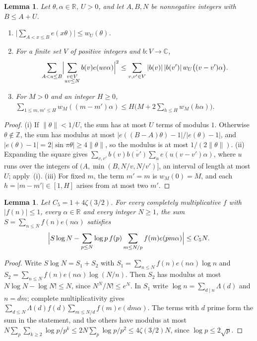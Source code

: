 \documentclass[12pt]{amsart}
\newtheorem{lemma}[theorem]{Lemma}
\theoremstyle{remark}
\newcommand{\C}{\mathbb{C}}
\newcommand{\R}{\mathbb{R}}
\begin{document}
\begin{lemma}\label{lem:bilinear}
Let $\theta,\alpha\in\R$, $U>0$, and let $A,B,N$ be nonnegative integers with $B\le A+U$.
\begin{enumerate}
\item[(i)] $\bigl|\sum_{A<x\le B}e(x\theta)\bigr|\le w_U(\theta)$.
\item[(ii)] For a finite set $V$ of positive integers and $b:V\to\C$,
\[
  \sum_{A<u\le B}\Bigl|\sum_{\substack{v\in V\\uv\le N}}b(v)e(uv\alpha)\Bigr|^2\le
  \sum_{v,v'\in V}|b(v)|\,|b(v')|\,w_U\bigl((v-v')\alpha\bigr).
\]
\item[(iii)] For $M>0$ and an integer $H\ge0$,
$\sum_{1\le m,m'\le H}w_M((m-m')\alpha)\le H\bigl(M+2\sum_{h\le H}w_M(h\alpha)\bigr)$.
\end{enumerate}
\end{lemma}

\begin{proof}
(i) If $\|\theta\|<1/U$, the sum has at most $U$ terms of modulus $1$. Otherwise
$\theta\notin\mathbb Z$, the sum has modulus at most $|e((B-A)\theta)-1|/|e(\theta)-1|$, and
$|e(\theta)-1|=2|\sin\pi\theta|\ge4\|\theta\|$, so the modulus is at most $1/(2\|\theta\|)$. (ii) Expanding the square gives
$\sum_{v,v'}b(v)\overline{b(v')}\sum_ue(u(v-v')\alpha)$, where $u$ runs over the integers of
$(A,\min(B,N/v,N/v')]$, an interval of length at most $U$; apply~(i). (iii) For fixed $m$, the
term $m'=m$ is $w_M(0)=M$, and each $h=|m-m'|\in[1,H]$ arises from at most two $m'$.
\end{proof}

\begin{lemma}\label{lem:reduction}
Let $C_5=1+4\zeta(3/2)$. For every completely multiplicative $f$ with $|f(n)|\le1$, every
$\alpha\in\R$ and every integer $N\ge1$, the sum $S=\sum_{n\le N}f(n)e(n\alpha)$ satisfies
\[
  \Bigl|S\log N-\sum_{p\le N}\log p\,f(p)\sum_{m\le N/p}f(m)e(pm\alpha)\Bigr|\le C_5N.
\]
\end{lemma}

\begin{proof}
Write $S\log N=S_1+S_2$ with $S_1=\sum_{n\le N}f(n)e(n\alpha)\log n$ and
$S_2=\sum_{n\le N}f(n)e(n\alpha)\log(N/n)$. Then $S_2$ has modulus at most $N\log N-\log N!\le N$, since $N^N/N!\le e^N$. In $S_1$ write
$\log n=\sum_{d\mid n}\Lambda(d)$ and $n=dm$; complete multiplicativity gives
$\sum_{d\le N}\Lambda(d)f(d)\sum_{m\le N/d}f(m)e(dm\alpha)$. The terms with $d$ prime form the sum in
the statement, and the others have modulus at most
$N\sum_p\sum_{k\ge2}\log p/p^k\le2N\sum_p\log p/p^2\le4\zeta(3/2)N$, since $\log p\le2\sqrt p$.
\end{proof}
\end{document}
